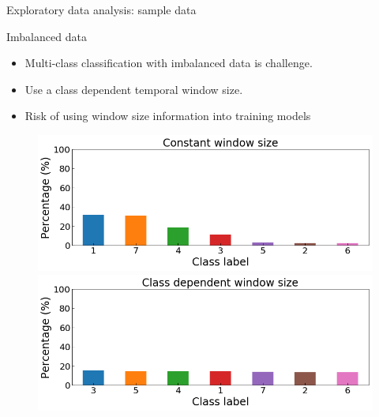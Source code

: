 \documentclass{if-beamer}
\begin{document}
\begin{frame}{Exploratory data analysis: sample data}
        \begin{block}{Imbalanced data}    
        \begin{itemize}
                \item Multi-class classification with imbalanced data is challenge. 
                \item Use a class dependent temporal window size.
                \item \alert{Risk of using window size information into training models}
        \end{itemize}                 
        
            	 \begin{figure}
                    \includegraphics[scale=0.18]{./figs/percentage_origin.png}
                    \includegraphics[scale=0.18]{./figs/percentage_balanced.png} 
                    \end{figure} 
   	 \end{block}
	
\end{frame}
\end{document}
